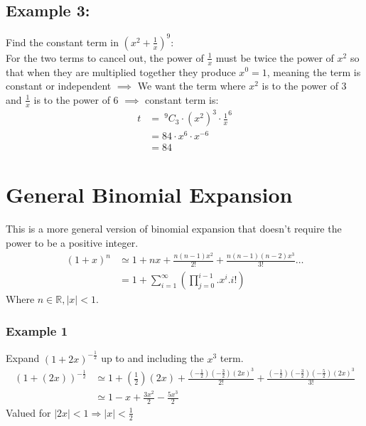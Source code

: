 \documentclass[a4paper,12pt,fleqn]{article}
\begin{document}
\subsection*{Example 3:}
Find the constant term in $(x^2 + \frac{1}{x})^9$:\\
For the two terms to cancel out, the power of $\frac{1}{x}$ must be twice the power of $x^2$ so that when they are multiplied together they produce $x^0 = 1$, meaning the term is constant or independent $\implies$ We want the term where $x^2$ is to the power of 3 and $\frac{1}{x}$ is to the power of 6 $\implies$ constant term is:
\begin{align*}
t & = \: ^9C_3 \cdot (x^2)^3 \cdot \frac{1}{x}^6\\
  & = 84 \cdot x^6 \cdot x^{-6}\\
  & = 84
\end{align*}
\section*{General Binomial Expansion}
This is a more general version of binomial expansion that doesn't require the power to be a positive integer. \\
\begin{align*}
(1+x)^n & \simeq 1 + nx + \frac{n(n-1)x^2}{2!} + \frac{n(n-1)(n-2)x^3}{3!} \dots \\
& = 1 + \sum^{\infty}_{i = 1} (\prod^{i-1}_{j = 0} . x^i . i!)
\end{align*} 
Where $n \in \mathbb{R}, |x| < 1$. \\
\subsubsection*{Example 1}
Expand $(1+2x)^{-\frac{1}{2}}$ up to and including the $x^3$ term. 
\begin{align*}
(1+(2x))^{-\frac{1}{2}} & \simeq 1 + (\frac{1}{2})(2x) + \frac{(-\frac{1}{2})(-\frac{3}{2})(2x)^3}{2!} + \frac{(-\frac{1}{2})(-\frac{3}{2})(-\frac{5}{2})(2x)^3}{3!} \\ 
& \simeq 1 -x + \frac{3x^2}{2} - \frac{5x^3}{2}
\end{align*}
Valued for $|2x| < 1 \Rightarrow |x| < \frac{1}{2}$\\
\end{document}
